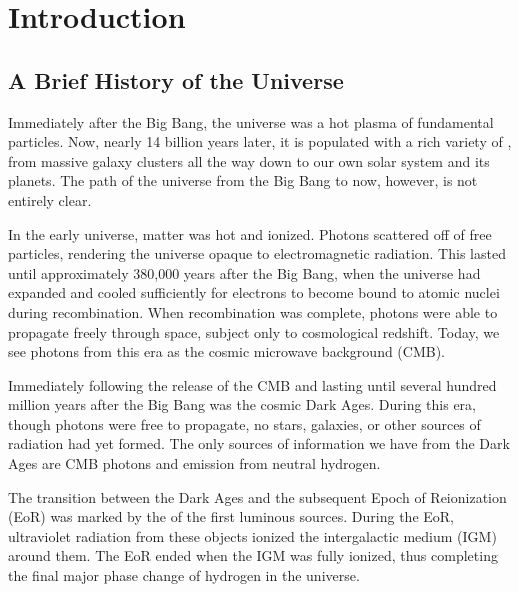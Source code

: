 \documentclass[12pt]{article}
\begin{document}
\clearpage
{}

\begingroup
\hypersetup{
	colorlinks=true,
	citecolor=DarkBlue,
	filecolor=black,
	linkcolor=black,
	urlcolor=DarkBlue
}
\tableofcontents
\listoffigures
\listoftables
\endgroup
\newpage

\begin{abstract}
\end{abstract}

\clearpage
{}

\section{Introduction} \label{sec:intro}

\subsection{A Brief History of the Universe} \label{subsec:universe}

Immediately after the Big Bang, the universe was a hot plasma of fundamental particles. Now, nearly 14 billion years later, it is populated with a rich variety of , from massive galaxy clusters all the way down to our own solar system and its planets. The  path of the universe from the Big Bang to now, however, is not entirely clear.

In the early universe, matter was hot and ionized. Photons scattered off of free particles, rendering the universe opaque to electromagnetic radiation. This lasted until approximately 380,000 years after the Big Bang, when the universe had expanded and cooled sufficiently for electrons to become bound to atomic nuclei during recombination. When recombination was complete, photons were able to propagate freely through space, subject only to cosmological redshift. Today, we see photons from this era as the cosmic microwave background (CMB).

Immediately following the release of the CMB and lasting until several hundred million years after the Big Bang was the cosmic Dark Ages. During this era, though photons were free to propagate, no stars, galaxies, or other sources of radiation had yet formed. The only sources of information we have from the Dark Ages are CMB photons and emission from neutral hydrogen.

The transition between the Dark Ages and the subsequent Epoch of Reionization (EoR) was marked by the  of the first luminous sources. During the EoR, ultraviolet  radiation from these objects ionized the intergalactic medium (IGM) around them. The EoR ended when the IGM was fully ionized, thus completing the final major phase change of hydrogen in the universe.
\end{document}
